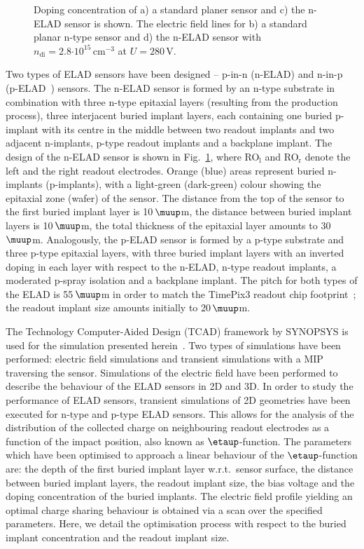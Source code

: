 \documentclass[a4paper,11pt]{article}
\begin{document}
\begin{figure}[t!]
  \caption{
Doping concentration of a) a standard planer sensor and c) the n-ELAD sensor is shown. 
The electric field lines for b) a standard planar n-type sensor and d) the n-ELAD sensor with $n\mathrm{_{di}} = 2.8\mathrm{\cdot10^{15}\,cm^{-3}}$ at $U=280$\,V.
}
  \label{fig:el}
\end{figure}

Two types of ELAD sensors have been designed -- p-in-n (n-ELAD) and n-in-p (p-ELAD~\cite{elad}) sensors.
The n-ELAD sensor is formed by an n-type substrate in combination with three n-type epitaxial layers (resulting from the production process),
 three interjacent buried implant layers, each containing one buried p-implant with its centre in the middle between two readout implants and two adjacent n-implants,
 p-type readout implants and a backplane implant.
The design of the n-ELAD sensor is shown in Fig.~\ref{fig:el}, where RO$_{\textrm{l}}$ and RO$_{\textrm{r}}$ denote the left and the right readout electrodes.
Orange (blue) areas represent buried n-implants (p-implants), with a light-green (dark-green) colour showing the epitaxial zone (wafer) of the sensor. 
The distance from the top of the sensor to the first buried implant layer is 10\,$\muup$m, the distance between buried implant layers is 10\,$\muup$m, the total thickness of the epitaxial layer amounts to 30\,$\muup$m.
Analogously, the p-ELAD sensor is formed by a p-type substrate and three p-type epitaxial layers,
 with three buried implant layers with an inverted doping in each layer with respect to the n-ELAD,
 n-type readout implants, a moderated p-spray isolation and a backplane implant.
The pitch for both types of the ELAD is 55\,$\muup$m in order to match the TimePix3 readout chip footprint~\cite{tp3}; the readout implant size amounts initially to 20\,$\muup$m.

The Technology Computer-Aided Design (TCAD) framework by SYNOPSYS is used for the simulation presented herein~\cite{syn}.
Two types of simulations have been performed: electric field simulations and transient simulations with a MIP traversing the sensor.
Simulations of the electric field have been performed to describe the behaviour of the ELAD sensors in 2D and 3D.
In order to study the performance of ELAD sensors, transient simulations of 2D geometries have been executed for n-type and p-type ELAD sensors.
This allows for the analysis of the distribution of the collected charge on neighbouring readout electrodes as a function of the impact position, also known as $\etaup$-function.
The parameters which have been optimised to approach a linear behaviour of the $\etaup$-function are: the depth of the first buried implant layer w.r.t.\ sensor surface, the distance between buried implant layers,
 the readout implant size, the bias voltage and the doping concentration of the buried implants. 
The electric field profile yielding an optimal charge sharing behaviour is obtained via a scan over the specified parameters.
Here, we detail the optimisation process with respect to the buried implant concentration and the readout implant size.
\end{document}
